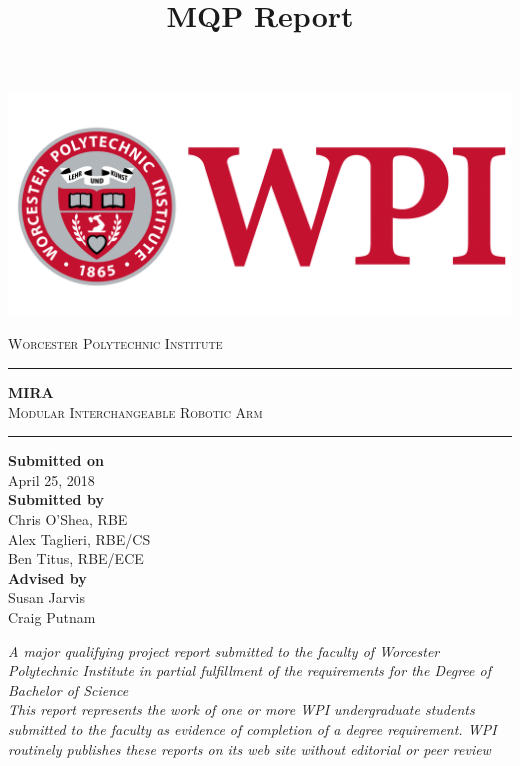 \documentclass[letterpaper,12pt,titlepage]{article}
\title{MQP Report}
\begin{document}
\begin{titlepage}
\begin{center}
\begin{minipage}{\textwidth}
\centering
\includegraphics[scale=0.1]{WPI_Inst_Prim_FulClr.png}

\LARGE
\textsc{Worcester Polytechnic Institute}
\vspace*{0.5cm}
\noindent\rule{\textwidth}{1pt}
\Huge
\textbf{MIRA} \\
\LARGE
\textsc{Modular Interchangeable Robotic Arm}
\vspace*{0.5cm}
\noindent\rule{\textwidth}{1pt}
\end{minipage}

\vspace{2cm}
\vfill    

\Large
\textbf{Submitted on} \\
\large
April 25, 2018\\
\vspace{0.8cm}
\Large
\textbf{Submitted by} \\
\large
Chris O'Shea, RBE\\
\large
Alex Taglieri, RBE/CS \\
\large
Ben Titus, RBE/ECE \\
\vspace{0.8cm}
\Large
\textbf{Advised by} \\
\large
Susan Jarvis \\
\large
Craig Putnam \\
    
\vfill
\end{center}

\normalsize
\noindent \textit{A major qualifying project report	submitted to the faculty of	Worcester Polytechnic Institute	in partial fulfillment of the requirements for the	Degree of Bachelor of Science} \\
\noindent \textit{This report represents the work of one or more WPI undergraduate students submitted to the faculty as evidence of completion of a degree requirement. WPI routinely publishes these reports on its web site without editorial or peer review}
\end{titlepage}
\end{document}
